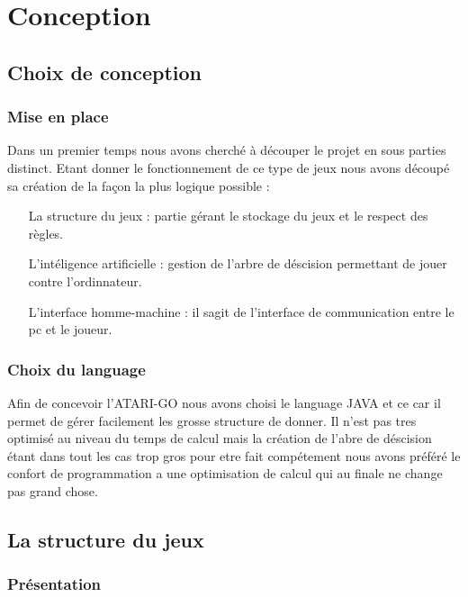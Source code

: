 \chapter{Conception}

\section{Choix de conception}

	\subsection{Mise en place}

		Dans un premier temps nous avons cherché à découper le projet en sous parties distinct. Etant donner le fonctionnement de ce type de jeux
		nous avons découpé sa création de la façon la plus logique possible :
		\begin{itemize}
			\item[La structure du jeux] : partie gérant le stockage du jeux et le respect des règles.
			\item[L'intéligence artificielle] : gestion de l'arbre de déscision permettant de jouer contre l'ordinnateur. 
			\item[L'interface homme-machine] : il sagit de l'interface de communication entre le pc et le joueur.
		\end{itemize}
		
	\subsection{Choix du language}
	
		Afin de concevoir l'ATARI-GO nous avons choisi le language JAVA et ce car il permet de gérer facilement les grosse structure de donner. 
		Il n'est pas tres optimisé au niveau du temps de calcul mais la création de l'abre de déscision étant dans tout les cas trop gros pour etre fait
		compétement nous avons préféré le confort de programmation a une optimisation de calcul qui au finale ne change pas grand chose.

\section{La structure du jeux}

	\subsection{Présentation}
	
